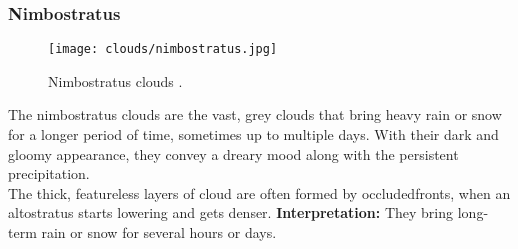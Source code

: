 \subsubsection{Nimbostratus}
\begin{wrapfigure}[10]{r}{6cm}
    \vspace{-\baselineskip}
    \texttt{[image: clouds/nimbostratus.jpg]}
    \caption{Nimbostratus clouds \protect\cite{cloudtypes:wiki:nimbostratus}.}
    \label{img:clouds:nimbostratus}
\end{wrapfigure}
The nimbostratus clouds are the vast, grey clouds that bring heavy rain or snow for a longer period of time, sometimes up to multiple days.
With their dark and gloomy appearance, they convey a dreary mood along with the persistent \gls{precipitation}.
\\
The thick, featureless layers of cloud are often formed by \gls{occludedfront}s, when an altostratus starts lowering and gets denser.
\emptyline
\textbf{Interpretation:}
They bring long-term rain or snow for several hours or days.